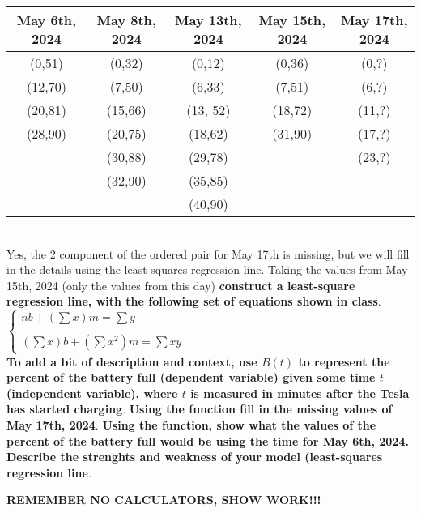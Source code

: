 \documentclass[10pt,letterpaper]{article}
\begin{document}
\begin{enumerate}
\begin{tabular}{c|c|c|c|c}
May 6th, 2024  & May 8th, 2024 & May 13th, 2024 & May 15th, 2024 & May 17th, 2024 \\
\hline
(0,51)  & (0,32) & (0,12) &(0,36) & (0,?)\\
(12,70) & (7,50) & (6,33)& (7,51)& (6,?)\\
(20,81) & (15,66) & (13, 52)& (18,72)&(11,?)\\
(28,90) & (20,75) & (18,62)&(31,90)& (17,?)\\
 & (30,88) & (29,78) && (23,?)\\
&(32,90) & (35,85) &&\\
& & (40,90)&&
\end{tabular}\\

Yes, the 2 component of the ordered pair for May 17th is missing, but we will fill in the details using the least-squares regression line.  Taking the values from May 15th, 2024 (only the values from this day) \textbf{construct a least-square regression line, with the following set of equations shown in class}.\\


$ \left\{ \begin{array}{ll}

 nb + (\sum x) m = \sum y & \\
& \\
(\sum x) b + (\sum x^2 ) m = \sum xy & 
\end{array}
\right.$ \\

\textbf{To add a bit of description and context, use $B(t)$ to represent the percent of the battery full (dependent variable) given some time $t$ (independent variable), where $t$ is measured in minutes after the Tesla has started charging}. \textbf{ Using the function fill in the missing values of May 17th, 2024}.  \textbf{Using the function, show what the values of the percent of the battery full would be using the time for May 6th, 2024.}  \textbf{Describe the strenghts and weakness of your model (least-squares regression line}.



\end{enumerate}



\begin{center}
\begin{large}

\textbf{REMEMBER NO CALCULATORS, SHOW WORK!!!}

\end{large}
\end{center}
\end{document}
